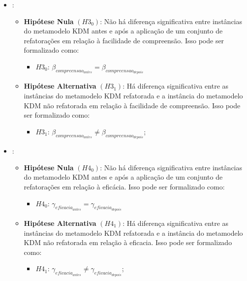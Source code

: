 \begin{itemize}
\item {}:

\begin{itemize}
\item \textbf{Hipótese Nula} \textbf{$(H3_{0})$}: Não há diferença significativa entre instâncias do metamodelo KDM antes e após a aplicação de um conjunto de refatorações em relação à facilidade de compreensão. Isso pode ser formalizado como: 

\begin{itemize}
\item $H3_{0}$: $\beta_{compreensao_{antes}} = \beta_{compreensao_{depois}}$
\end{itemize}

\item \textbf{Hipótese Alternativa} \textbf{$(H3_{1})$}: Há diferença significativa entre as instâncias do metamodelo KDM refatorada e a instância do metamodelo KDM não refatorada em relação à facilidade de compreensão. Isso pode ser formalizado como: 

\begin{itemize}
\item $H3_{1}$: $\beta_{compreensao_{antes}} \neq \beta_{compreensao_{depois}}$;
\end{itemize}
\end{itemize}

\item {}:
    
    \begin{itemize}
\item \textbf{Hipótese Nula} \textbf{$(H4_{0})$}: Não há diferença significativa entre instâncias do metamodelo KDM antes e após a aplicação de um conjunto de refatorações em relação à eficácia. Isso pode ser formalizado como: 

\begin{itemize}
\item $H4_{0}$: $\gamma_{eficacia_{antes}} = \gamma_{eficacia_{depois}}$
\end{itemize}

\item \textbf{Hipótese Alternativa} \textbf{$(H4_{1})$}: Há diferença significativa entre as instâncias do metamodelo KDM refatorada e a instância do metamodelo KDM não refatorada em relação à eficacia. Isso pode ser formalizado como: 

\begin{itemize}
\item $H4_{1}$: $\gamma_{eficacia_{antes}} \neq \gamma_{eficacia_{depois}}$;
\end{itemize}
\end{itemize}

\end{itemize}

